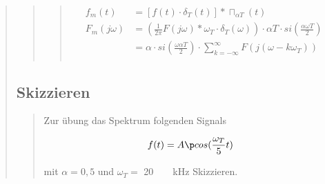 \begin{quote}
\begin{quote}
\begin{quote}
            
            \begin{equation*}
                \begin{split}
                    f_m (t) &= [f (t) \cdot \delta_T (t)] \ast \sqcap_{\alpha T} (t)\\
                    F_m (j\omega) &= \left ( \frac{1}{2 \pi} F (j\omega) \ast \omega_T \cdot \delta_T (\omega) \right) \cdot
                    \alpha T \cdot si (\frac{\alpha \omega T}{2})\\
                    &= \alpha \cdot si \left( \frac{\omega \alpha T}{2} \right) \cdot \sum_{k=-\infty}^{\infty} F(j(\omega -
                    k\omega_T))\\
                \end{split}
            \end{equation*}
            
            
        \end{quote}
        
        
    \end{quote}
    
    
    \subsection{Skizzieren}
    \begin{quote}
        Zur übung das Spektrum folgenden Signals
        
        \begin{equation*}
        	\begin{split}
                f(t) = A \p cos(\frac{\omega_T}{5} t)
        	\end{split}
        \end{equation*}
        
        mit $\alpha = 0,5$ und $\omega_T =$ \SI{20}{\pi\ \kilo\hertz} Skizzieren.
        

\end{quote}
\end{quote}
